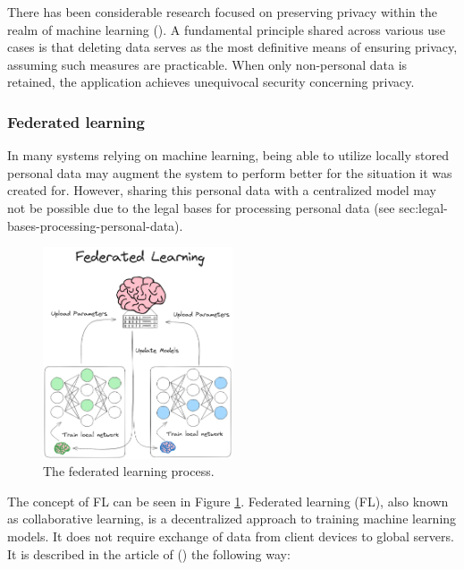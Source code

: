 There has been considerable research focused on preserving privacy within the realm of machine learning (\cite{ra2023visual_privacy_techniques}). A fundamental principle shared across various use cases is that deleting data serves as the most definitive means of ensuring privacy, assuming such measures are practicable. When only non-personal data is retained, the application achieves unequivocal security concerning privacy.

\subsubsection{Federated learning}
\label{sec:federated_learning}
In many systems relying on machine learning, being able to utilize locally stored personal data may augment the system to perform better for the situation it was created for. However, sharing this personal data with a centralized model may not be possible due to the legal bases for processing personal data (see sec:legal-bases-processing-personal-data).


\begin{figure}[H]
    \centering
    \includegraphics[width=0.5\textwidth]{Images/Diagrams/FL_updated.png}
    \caption{\centering The federated learning process.}
    \label{fig:federatedlearning}
\end{figure}

The concept of FL can be seen in Figure \ref{fig:federatedlearning}. Federated learning (FL), also known as collaborative learning, is a decentralized approach to training machine learning models. It does not require exchange of data from client devices to global servers. It is described in the article of \citeauthor{an2022federatedlearninghealthcare} (\citeyear{an2022federatedlearninghealthcare}) the following way: 

